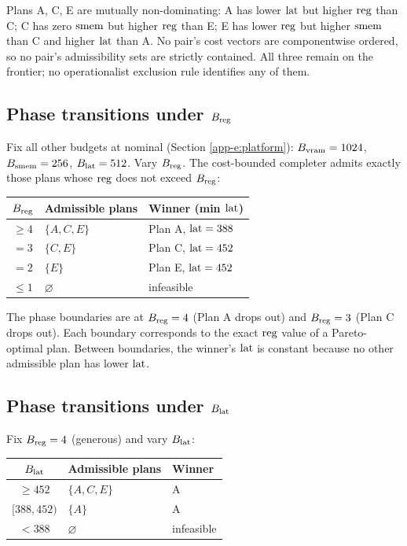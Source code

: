 Plans A, C, E are mutually non-dominating: A has
lower $\operatorname{lat}$ but higher $\operatorname{reg}$ than C; C has zero
$\operatorname{smem}$ but higher $\operatorname{reg}$ than E; E has lower
$\operatorname{reg}$ but higher $\operatorname{smem}$ than C and higher $\operatorname{lat}$
than A. No pair's cost vectors are componentwise
ordered, so no pair's admissibility sets are
strictly contained. All three remain on the
frontier; no operationalist exclusion rule
identifies any of them.

\subsection{Phase transitions under $B_{\operatorname{reg}}$}
\label{app-e:phase-reg}

Fix all other budgets at nominal
(Section \ref{app-e:platform}): $B_{\operatorname{vram}} = 1024$,
$B_{\operatorname{smem}} = 256$, $B_{\operatorname{lat}} = 512$. Vary $B_{\operatorname{reg}}$.
The cost-bounded completer admits exactly those
plans whose $\operatorname{reg}$ does not exceed $B_{\operatorname{reg}}$:

\begin{center}
\begin{tabular}{c|l|l}
$B_{\operatorname{reg}}$ & Admissible plans & Winner (min $\operatorname{lat}$) \\
\hline
$\geq 4$ & $\{A, C, E\}$       & Plan A, $\operatorname{lat} = 388$ \\
$= 3$    & $\{C, E\}$          & Plan C, $\operatorname{lat} = 452$ \\
$= 2$    & $\{E\}$             & Plan E, $\operatorname{lat} = 452$ \\
$\leq 1$ & $\varnothing$       & infeasible \\
\end{tabular}
\end{center}

The phase boundaries are at $B_{\operatorname{reg}} = 4$ (Plan A
drops out) and $B_{\operatorname{reg}} = 3$ (Plan C drops out).
Each boundary corresponds to the exact $\operatorname{reg}$ value
of a Pareto-optimal plan. Between boundaries, the
winner's $\operatorname{lat}$ is constant because no other
admissible plan has lower $\operatorname{lat}$.

\subsection{Phase transitions under $B_{\operatorname{lat}}$}
\label{app-e:phase-lat}

Fix $B_{\operatorname{reg}} = 4$ (generous) and vary $B_{\operatorname{lat}}$:

\begin{center}
\begin{tabular}{c|l|l}
$B_{\operatorname{lat}}$ & Admissible plans & Winner \\
\hline
$\geq 452$ & $\{A, C, E\}$ & A \\
$[388, 452)$ & $\{A\}$ & A \\
$< 388$ & $\varnothing$ & infeasible \\
\end{tabular}
\end{center}

